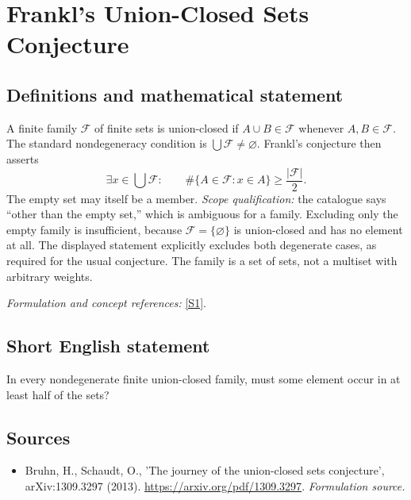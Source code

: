 \documentclass[11pt]{article}
\begin{document}
\section*{\texorpdfstring{Frankl's Union-Closed Sets Conjecture}{Frankl's Union-Closed Sets Conjecture}}\label{55}
\subsection{Definitions and mathematical statement}
A finite family $\mathcal F$ of finite sets is union-closed if $A\cup B\in\mathcal F$ whenever $A,B\in\mathcal F$. The standard nondegeneracy condition is $\bigcup\mathcal F\ne\varnothing$. Frankl's conjecture then asserts
\[
 \exists x\in\bigcup\mathcal F:\qquad
 \#\{A\in\mathcal F:x\in A\}\ge\frac{|\mathcal F|}{2}.
\]
The empty set may itself be a member. \emph{Scope qualification:} the catalogue says ``other than the empty set,'' which is ambiguous for a family. Excluding only the empty family is insufficient, because $\mathcal F=\{\varnothing\}$ is union-closed and has no element at all. The displayed statement explicitly excludes both degenerate cases, as required for the usual conjecture. The family is a set of sets, not a multiset with arbitrary weights.
\par\smallskip\textit{Formulation and concept references:} \href{https://arxiv.org/pdf/1309.3297}{[S1]}.

\subsection{Short English statement}
In every nondegenerate finite union-closed family, must some element occur in at least half of the sets?
\subsection{Sources}
\begin{itemize}
\item[S1]Bruhn, H., Schaudt, O., 'The journey of the union-closed sets conjecture', arXiv:1309.3297 (2013).
\url{https://arxiv.org/pdf/1309.3297}.
\textit{Formulation source.}
\end{itemize}
\end{document}
